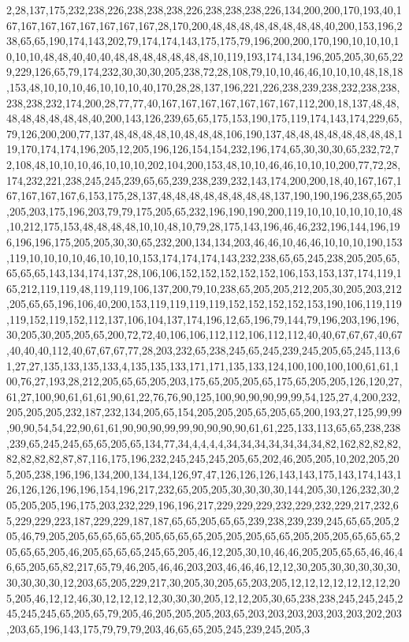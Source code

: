 2,28,137,175,232,238,226,238,238,238,226,238,238,238,226,134,200,200,170,193,40,167,167,167,167,167,167,167,167,28,170,200,48,48,48,48,48,48,48,48,40,200,153,196,238,65,65,190,174,143,202,79,174,174,143,175,175,79,196,200,200,170,190,10,10,10,10,10,10,48,48,40,40,40,48,48,48,48,48,48,48,10,119,193,174,134,196,205,205,30,65,229,229,126,65,79,174,232,30,30,30,205,238,72,28,108,79,10,10,46,46,10,10,10,48,18,18,153,48,10,10,10,46,10,10,10,40,170,28,28,137,196,221,226,238,239,238,232,238,238,238,238,232,174,200,28,77,77,40,167,167,167,167,167,167,167,112,200,18,137,48,48,48,48,48,48,48,48,40,200,143,126,239,65,65,175,153,190,175,119,174,143,174,229,65,79,126,200,200,77,137,48,48,48,48,10,48,48,48,106,190,137,48,48,48,48,48,48,48,48,119,170,174,174,196,205,12,205,196,126,154,154,232,196,174,65,30,30,30,65,232,72,72,108,48,10,10,10,46,10,10,10,202,104,200,153,48,10,10,46,46,10,10,10,200,77,72,28,174,232,221,238,245,245,239,65,65,239,238,239,232,143,174,200,200,18,40,167,167,167,167,167,167,6,153,175,28,137,48,48,48,48,48,48,48,48,137,190,190,196,238,65,205,205,203,175,196,203,79,79,175,205,65,232,196,190,190,200,119,10,10,10,10,10,10,48,10,212,175,153,48,48,48,48,10,10,48,10,79,28,175,143,196,46,46,232,196,144,196,196,196,196,175,205,205,30,30,65,232,200,134,134,203,46,46,10,46,46,10,10,10,190,153,119,10,10,10,10,46,10,10,10,153,174,174,174,143,232,238,65,65,245,238,205,205,65,65,65,65,143,134,174,137,28,106,106,152,152,152,152,152,106,153,153,137,174,119,165,212,119,119,48,119,119,106,137,200,79,10,238,65,205,205,212,205,30,205,203,212,205,65,65,196,106,40,200,153,119,119,119,119,152,152,152,152,153,190,106,119,119,119,152,119,152,112,137,106,104,137,174,196,12,65,196,79,144,79,196,203,196,196,30,205,30,205,205,65,200,72,72,40,106,106,112,112,106,112,112,40,40,67,67,67,40,67,40,40,40,112,40,67,67,67,77,28,203,232,65,238,245,65,245,239,245,205,65,245,113,61,27,27,135,133,135,133,4,135,135,133,171,171,135,133,124,100,100,100,100,61,61,100,76,27,193,28,212,205,65,65,205,203,175,65,205,205,65,175,65,205,205,126,120,27,61,27,100,90,61,61,61,90,61,22,76,76,90,125,100,90,90,90,99,99,54,125,27,4,200,232,205,205,205,232,187,232,134,205,65,154,205,205,205,65,205,65,200,193,27,125,99,99,90,90,54,54,22,90,61,61,90,90,90,99,99,90,90,90,90,61,61,225,133,113,65,65,238,238,239,65,245,245,65,65,205,65,134,77,34,4,4,4,4,34,34,34,34,34,34,34,82,162,82,82,82,82,82,82,82,87,87,116,175,196,232,245,245,245,205,65,202,46,205,205,10,202,205,205,205,238,196,196,134,200,134,134,126,97,47,126,126,126,143,143,175,143,174,143,126,126,126,196,196,154,196,217,232,65,205,205,30,30,30,30,144,205,30,126,232,30,205,205,205,196,175,203,232,229,196,196,217,229,229,229,232,229,232,229,217,232,65,229,229,223,187,229,229,187,187,65,65,205,65,65,239,238,239,239,245,65,65,205,205,46,79,205,205,65,65,65,65,205,65,65,65,205,205,205,65,65,205,205,205,65,65,65,205,65,65,205,46,205,65,65,65,245,65,205,46,12,205,30,10,46,46,205,205,65,65,46,46,46,65,205,65,82,217,65,79,46,205,46,46,203,203,46,46,46,12,12,30,205,30,30,30,30,30,30,30,30,30,12,203,65,205,229,217,30,205,30,205,65,203,205,12,12,12,12,12,12,12,205,205,46,12,12,46,30,12,12,12,12,30,30,30,205,12,12,205,30,65,238,238,245,245,245,245,245,245,65,205,65,79,205,46,205,205,205,203,65,203,203,203,203,203,203,202,203,203,65,196,143,175,79,79,79,203,46,65,65,205,245,239,245,205,3